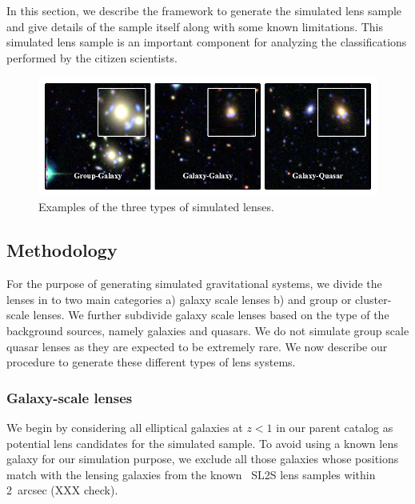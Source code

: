 \documentclass[useAMS,usenatbib,a4paper]{mn2e}
\begin{document}
In this section, we describe the framework to generate the simulated lens sample
and give details of the sample itself along with some known limitations. This
simulated lens sample is an important component for analyzing the
classifications performed by the citizen scientists.

\begin{figure}
\begin{center}
\includegraphics[scale=1.0]{sw-cfhtls-figs/sim_cgq.pdf}
\caption{ \label{fig:sim}
Examples of the three types of simulated lenses.
}
\end{center}
\end{figure}


\subsection{Methodology}
\label{sec:simmethod}

For the purpose of generating simulated gravitational systems, we divide the
lenses in to two main categories a) galaxy scale lenses b) and group or
cluster-scale lenses. We further subdivide galaxy scale lenses based on the
type of the background sources, namely galaxies and quasars. We do not simulate
group scale quasar lenses as they are expected to be extremely rare. We now
describe our procedure to generate these different types of lens systems.


\subsubsection{Galaxy-scale lenses}
\label{sect:gallens}

We begin by considering all elliptical galaxies at $z<1$ in our parent \cfhtls
catalog as potential lens candidates for the simulated sample. To avoid using a
known lens galaxy for our simulation purpose, we exclude all those galaxies
whose positions match with the lensing galaxies from the known \cfhtls~SL2S lens
samples \cite{More2012} within 2~arcsec (XXX check).
\end{document}
